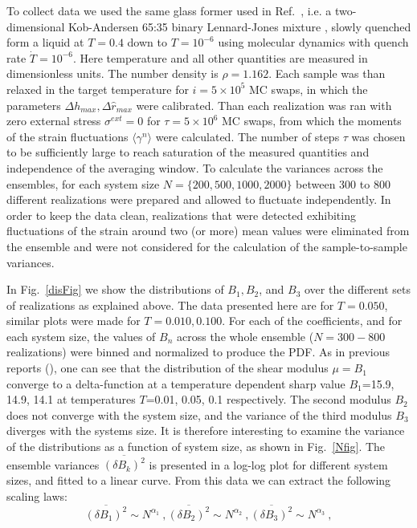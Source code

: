 \documentclass[pre,twocolumn,aps,10pt,superscriptaddress,notitlepage,nofootinbib]{revtex4-1}
\begin{document}
To collect data we used the same glass former used in Ref.~\cite{PRSS16}, i.e.  a  two-dimensional Kob-Andersen 65:35  binary Lennard-Jones mixture \cite{94KA, KA2D}, slowly quenched form a liquid at $T=0.4$ down to $T=10^{-6}$ using molecular dynamics with quench rate $\dot{T} = 10^{-6}$. Here temperature and all other
quantities are measured in dimensionless units. The number density is $\rho=1.162$. Each sample was than relaxed in the target temperature for $i=5 \times 10^5$ MC swaps, in which the parameters   $\Delta h_{max}, \Delta \hat{  r}_{max}$ were calibrated. Than each realization was ran  with zero external stress $\sigma^{ext}=0$ for $\tau=5 \times 10^6$ MC swaps, from which the moments of the strain fluctuations $\langle \gamma^n \rangle$  were calculated. The number of steps $\tau$ was chosen to be sufficiently large to reach saturation of the measured quantities and independence of the averaging window. To calculate the variances across the ensembles, for each system size $N=\{ 200,500,1000,2000\}$  between 300 to 800 different realizations were prepared and allowed to fluctuate independently. In order to keep the data clean, realizations that were detected exhibiting fluctuations of the strain around two (or more) mean values were eliminated from the ensemble and were not considered for the calculation of the sample-to-sample variances.

In Fig.~\ref{disFig} we show the distributions of $B_1,B_2$, and $B_3$ over the different sets of realizations as explained above. The data presented here are for $T=0.050$, similar plots were made for $T=0.010, 0.100$. For each of the coefficients, and for each system size, the values of $B_n$  across the whole ensemble ($N=300-800$ realizations) were binned and normalized to produce the PDF.  As in previous reports (\cite{HentschelKarmakar11,PRSS16}), one can see that the distribution of the shear modulus $\mu=B_1$  converge to a delta-function at a temperature dependent sharp value $B_1$=15.9, 14.9, 14.1 at temperatures $T$=0.01, 0.05,
0.1 respectively. The second modulus $B_2$ does
not converge with the system size, and the variance of the third modulus $B_3$ diverges with the systems size.
It is therefore interesting to examine the variance of the distributions as a function of system size, as
 shown in Fig.~\ref{Nfig}.  The ensemble variances $\overline{(\delta B_k)^2}$ is presented in a log-log
 plot for different system sizes, and fitted to a linear curve. From this data we can extract the following
 scaling laws:
\begin{equation}
\overline{(\delta B_1)^2} \sim N^{\alpha_1} \ ,  \overline{(\delta B_2)^2} \sim N^{\alpha_2} \ , \overline{(\delta B_3)^2} \sim N^{\alpha_3} \ ,
\end{equation}
\end{document}
